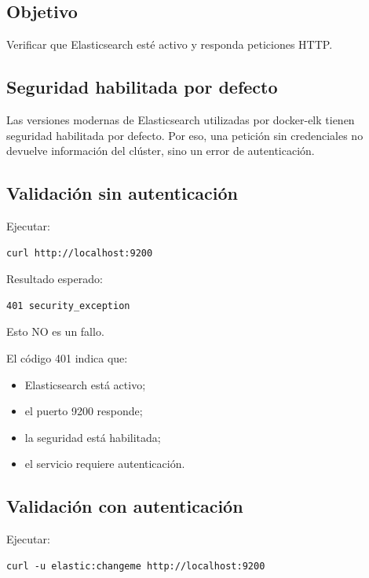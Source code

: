 \documentclass[
  coursetitle={Cómputo Nube y Tecnologías Emergentes},
  coursehours={96},
  coursedate={Verano 2026},
  doctype={Laboratorio},
  otherlangs={english,french},
  authorname={Lázaro},
  authorsurname={Bustio-Martínez},
  authortitle={PhD},
  role={Profesor Investigador},
  email={lbustio@inaoe.mx},
  phone={5559504000},
  ext={7459},
  institution={Instituto Nacional de Astrofísica, Óptica y Electrónica (INAOE)},
  department={Maestría en Ciencias en Tecnologías de Seguridad},
  address={Luis Enrique Erro 1, Sta. Ma. Tonantzintla, San Andrés Cholula, CP 72840, Puebla, México},
  margin={0.5in}
]{../../lbustio_lecture_notes}
\begin{document}
\subsection{Objetivo}

Verificar que Elasticsearch esté activo y responda peticiones HTTP.

\subsection{Seguridad habilitada por defecto}

Las versiones modernas de Elasticsearch utilizadas por docker-elk tienen seguridad habilitada por defecto. Por eso, una petición sin credenciales no devuelve información del clúster, sino un error de autenticación.

\subsection{Validación sin autenticación}

Ejecutar:

\begin{lstlisting}
curl http://localhost:9200
\end{lstlisting}

Resultado esperado:

\begin{verbatim}
401 security_exception
\end{verbatim}

Esto NO es un fallo.

El código 401 indica que:

\begin{itemize}
    \item Elasticsearch está activo;
    \item el puerto 9200 responde;
    \item la seguridad está habilitada;
    \item el servicio requiere autenticación.
\end{itemize}

\subsection{Validación con autenticación}

Ejecutar:

\begin{lstlisting}
curl -u elastic:changeme http://localhost:9200
\end{lstlisting}
\end{document}
